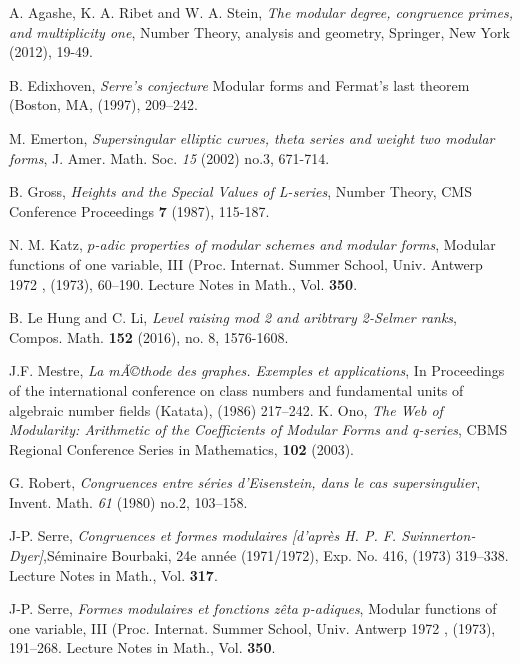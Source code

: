 \documentclass[13pt]{amsart}
\theoremstyle{remark}
\numberwithin{theorem}{section} \numberwithin{equation}{section}
\begin{document}
\begin{thebibliography}{99}

 A. Agashe, K. A. Ribet and W. A. Stein, \emph{The modular degree, congruence primes, and multiplicity one}, Number Theory, analysis and geometry, Springer, New York (2012), 19-49.

  B. Edixhoven, \emph{Serre's conjecture}  Modular forms and {F}ermat's last theorem ({B}oston, {MA}, (1997), 209--242.
              

 M. Emerton, \emph{Supersingular elliptic curves, theta series and weight two modular forms}, J. Amer. Math. Soc. \emph{15} (2002) no.3, 671-714. 

 B. Gross, \emph{Heights and the Special Values of L-series}, Number Theory, CMS Conference Proceedings \textbf{7} (1987), 115-187.

  N. M. Katz, \emph{{$p$}-adic properties of modular schemes and modular forms}, Modular functions of one variable, {III} ({P}roc. {I}nternat.
              {S}ummer {S}chool, {U}niv. {A}ntwerp 1972 , (1973), 60--190. Lecture Notes in Math., Vol. \textbf{350}.

 B. Le Hung and C. Li, \emph{Level raising mod 2 and aribtrary 2-Selmer ranks}, Compos. Math. \textbf{152} (2016), no. 8, 1576-1608.

 J.F. Mestre, \emph{La mÃ©thode des graphes. Exemples et applications}, In Proceedings of the international conference on class numbers and fundamental units of algebraic number fields (Katata), (1986) 217--242.
 K. Ono, \emph{The Web of Modularity: Arithmetic of the Coefficients of Modular Forms and q-series},
CBMS Regional Conference Series in Mathematics, \textbf{102} (2003).

 G. Robert, \emph{Congruences entre s\'eries d'{E}isenstein, dans le cas
              supersingulier}, Invent. Math. \emph{61} (1980) no.2, 103--158. 

 J-P. Serre, \emph{Congruences et formes modulaires [d'apr\`es {H}. {P}. {F}.
              {S}winnerton-{D}yer]},S\'eminaire {B}ourbaki, 24e ann\'ee (1971/1972), {E}xp. {N}o.
              416, (1973) 319--338. Lecture Notes in Math., Vol. \textbf{317}.

 J-P. Serre, \emph{Formes modulaires et fonctions z\^eta {$p$}-adiques}, Modular functions of one variable, {III} ({P}roc. {I}nternat.
              {S}ummer {S}chool, {U}niv. {A}ntwerp 1972 , (1973), 191--268. Lecture Notes in Math., Vol. \textbf{350}.


\end{thebibliography}
\end{document}
